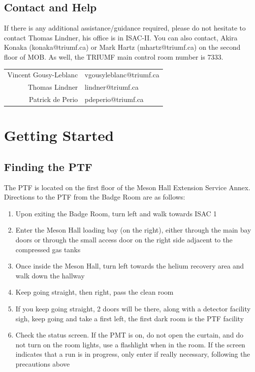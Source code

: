 \documentclass[twoside,letterpaper]{refart}
\begin{document}
\subsection{Contact and Help}

If there is any additional assistance/guidance required, please do not hesitate to contact Thomas Lindner, his office is in ISAC-II. You can also contact, Akira Konaka (konaka@triumf.ca) or Mark Hartz (mhartz@triumf.ca) on the second floor of MOB. As well, the TRIUMF main control room number is 7333.

\begin{center}\begin{tabular}{rl}
	Vincent Gousy-Leblanc & vgousyleblanc@triumf.ca \\
	Thomas Lindner & lindner@triumf.ca \\
	Patrick de Perio     & pdeperio@triumf.ca
\end{tabular}\end{center}

\newpage

\section{Getting Started}

\subsection{Finding the PTF}

The PTF is located on the first floor of the Meson Hall Extension Service Annex. Directions to the PTF from the Badge Room are as follows:

\begin{enumerate}
	\item Upon exiting the Badge Room, turn left and walk towards ISAC 1
	\item Enter the Meson Hall loading bay (on the right), either through the main bay doors or through the small access door on the right side adjacent to the compressed gas tanks
	\item Once inside the Meson Hall, turn left towards the helium recovery area and walk down the hallway
	\item Keep going straight, then right, pass the clean room
	\item If you keep going straight, 2 doors will be there, along with a detector facility sigh, keep going and take a first left, the first dark room is the PTF facility
	\item Check the status screen. If the PMT is on, do not open the curtain, and do not turn on the room lights, use a flashlight when in the room. If the screen indicates that a run is in progress, only enter if really necessary, following the precautions above
\end{enumerate}
\end{document}
